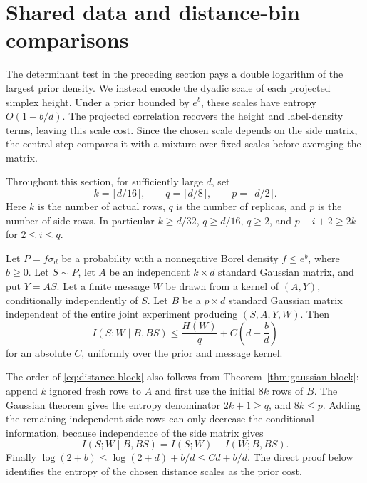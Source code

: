 \section{Shared data and distance-bin comparisons}
\label{sec:distance-bins}

The determinant test in the preceding section pays a double logarithm of
the largest prior density. We instead encode the dyadic scale of each
projected simplex height. Under a prior bounded by $e^b$, these scales
have entropy $O(1+b/d)$. The projected correlation recovers the height
and label-density terms, leaving this scale cost. Since the chosen scale
depends on the side matrix, the central step compares it with a mixture
over fixed scales before averaging the matrix.

Throughout this section, for sufficiently large $d$, set
\begin{equation}\label{eq:distance-dimensions}
 k=\lfloor d/16\rfloor,\qquad q=\lfloor d/8\rfloor,\qquad
 p=\lfloor d/2\rfloor.
\end{equation}
Here $k$ is the number of actual rows, $q$ is the number of replicas,
and $p$ is the number of side rows. In particular $k\ge d/32$,
$q\ge d/16$, $q\ge2$, and $p-i+2\ge2k$ for $2\le i\le q$.

\begin{theorem}\label{thm:distance-block}
Let $P=f\sigma_d$ be a probability with a nonnegative Borel density
$f\le e^b$, where $b\ge0$. Let $S\sim P$, let $A$ be an independent
$k\times d$ standard Gaussian matrix, and put $Y=AS$. Let a finite message
$W$ be drawn from a kernel of $(A,Y)$, conditionally independently of $S$.
Let $B$ be a $p\times d$ standard Gaussian matrix independent of the
entire joint experiment producing $(S,A,Y,W)$. Then
\begin{equation}\label{eq:distance-block}
 I(S;W\mid B,BS)\le\frac{H(W)}q+C\left(d+\frac bd\right)
\end{equation}
for an absolute $C$, uniformly over the prior and message kernel.
\end{theorem}

The order of \eqref{eq:distance-block} also follows from
Theorem~\ref{thm:gaussian-block}: append $k$ ignored fresh rows to $A$
and first use the initial $8k$ rows of $B$. The Gaussian theorem gives
the entropy denominator $2k+1\ge q$, and $8k\le p$. Adding the remaining
independent side rows can only decrease the conditional information,
because independence of the side matrix gives
\[
 I(S;W\mid B,BS)=I(S;W)-I(W;B,BS).
\]
Finally $\log(2+b)\le\log(2+d)+b/d\le Cd+b/d$. The direct proof below
identifies the entropy of the chosen distance scales as the prior cost.

